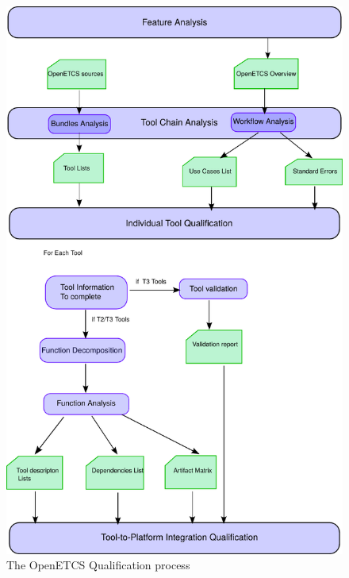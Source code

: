 \begin{figure}[htbp]
\includegraphics[width=\textwidth]{openETCS_process.pdf}
\caption{\label{fig:openetcs-process} The OpenETCS Qualification process}
\end{figure}

